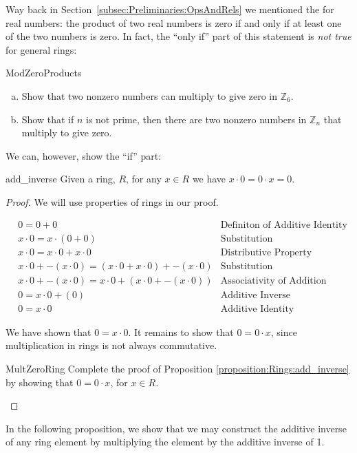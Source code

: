Way back in Section~\ref{subsec:Preliminaries:OpsAndRels} we mentioned the  for real numbers: the product of two real numbers is zero if and only if at least one of the two numbers is zero. In fact, the ``only if'' part of this statement is \emph{not true} for general rings:

\begin{exercise}{ModZeroProducts}
\begin{enumerate}[(a)]
\item Show that two nonzero numbers can multiply to give zero in ${\mathbb Z}_6$.
\item Show that if $n$ is not prime, then there are two nonzero numbers in ${\mathbb Z}_n$ that multiply to give zero.
\end{enumerate}
\end{exercise}
We can, however, show the ``if'' part:

\begin{prop}{add_inverse}
Given a ring, $R$, for any $x\in R$ we have $x\cdot0=0\cdot x=0$.

\begin{proof}
We will use properties of rings in our proof.

\begin{align*}
&0=0+0 & \text{Definiton of Additive Identity}\\
&x\cdot0=x\cdot(0+0) & \text{Substitution}\\
&x\cdot0=x\cdot0+x\cdot0 & \text{Distributive Property}\\
&x\cdot0+-(x\cdot0)=(x\cdot0+x\cdot0)+-(x\cdot0) & \text{Substitution}\\
&x\cdot0+-(x\cdot0)=x\cdot0+(x\cdot0+-(x\cdot0)) & \text{Associativity of Addition}\\
&0=x\cdot0+(0) & \text{Additive Inverse}\\
&0=x\cdot0 & \text{Additive Identity}
\end{align*}

We have shown that $0=x\cdot0$. It remains to show that $0=0\cdot x$, since multiplication in rings is not always commutative.

\begin{exercise}{MultZeroRing}
Complete the proof of Proposition \ref{proposition:Rings:add_inverse} by showing that $0=0\cdot x$, for $x\in R$.
\end{exercise}
\end{proof}
\end{prop}
In the following proposition, we show that we may construct the additive inverse of any ring element by multiplying the element by the additive inverse of 1.

